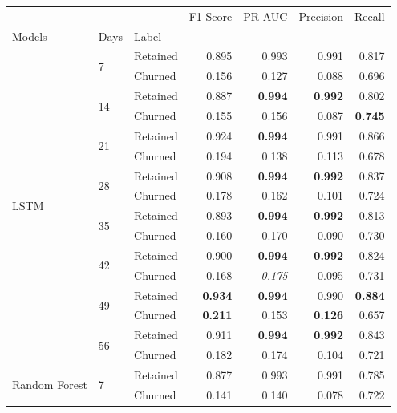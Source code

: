 \documentclass{kththesis}
\begin{document}
\begin{table}
\centering
\begin{tabular}{lllrrrr}
\toprule
     &   &          &  F1-Score &    PR AUC &  Precision &    Recall \\
Models & Days & Label &           &           &            &           \\
\midrule
\multirow{16}{*}{LSTM} & \multirow{2}{*}{7} & Retained &  0.895 &  0.993 &   0.991 &  0.817 \\
     &   & Churned &  0.156 &  0.127 &   0.088 &  0.696 \\
\cline{2-7}
     & \multirow{2}{*}{14} & Retained &  0.887 &  \textbf{0.994} &   \textbf{0.992} &  0.802 \\
     &   & Churned &  0.155 &  0.156 &   0.087 &  \textbf{0.745} \\
\cline{2-7}
     & \multirow{2}{*}{21} & Retained &  0.924 &  \textbf{0.994} &   0.991 &  0.866 \\
     &   & Churned &  0.194 &  0.138 &   0.113 &  0.678 \\
\cline{2-7}
     & \multirow{2}{*}{28} & Retained &  0.908 &  \textbf{0.994} &   \textbf{0.992} &  0.837 \\
     &   & Churned &  0.178 &  0.162 &   0.101 &  0.724 \\
\cline{2-7}
     & \multirow{2}{*}{35} & Retained &  0.893 &  \textbf{0.994} &   \textbf{0.992} &  0.813 \\
     &   & Churned &  0.160 &  0.170 &   0.090 &  0.730 \\
\cline{2-7}
     & \multirow{2}{*}{42} & Retained &  0.900 &  \textbf{0.994} &  \textbf{0.992} &  0.824 \\
     &   & Churned &  0.168 &  \textit{0.175} &   0.095 &  0.731 \\
\cline{2-7}
     & \multirow{2}{*}{49} & Retained &  \textbf{0.934} &  \textbf{0.994} &   0.990 &  \textbf{0.884} \\
     &   & Churned &  \textbf{0.211} &  0.153 &   \textbf{0.126} &  0.657 \\
\cline{2-7}
     & \multirow{2}{*}{56} & Retained &  0.911 &  \textbf{0.994} &   \textbf{0.992} &  0.843 \\
     &   & Churned &  0.182 &  0.174 &   0.104 &  0.721 \\
\cline{1-7}
\cline{2-7}
\multirow{16}{*}{Random Forest} & \multirow{2}{*}{7} & Retained &  0.877 &  0.993 &   0.991 &  0.785 \\
     &   & Churned &  0.141 &  0.140 &   0.078 &  0.722 \\

\end{tabular}
\end{table}
\end{document}
